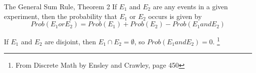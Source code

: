 \documentclass[a4paper,12pt]{book}
\newcounter{question}
\begin{document}
        \newpage
        \begin{intro}{The General Sum Rule, Theorem 2}
            If $E_1$ and $E_2$ are any events in a given experiment,
            then the probability that $E_1$ or $E_2$ occurs is given by
            $$ Prob(E_1 or E_2) = Prob(E_1) + Prob(E_2) - Prob(E_1 and E_2) $$
            
            If $E_1$ and $E_2$ are disjoint, then $E_1 \cap E_2 = \emptyset$,
            so $Prob(E_1 and E_2) = 0$.       
            \footnote{From Discrete Math by Ensley and Crawley, page 450}
        \end{intro}
        
\end{document}
